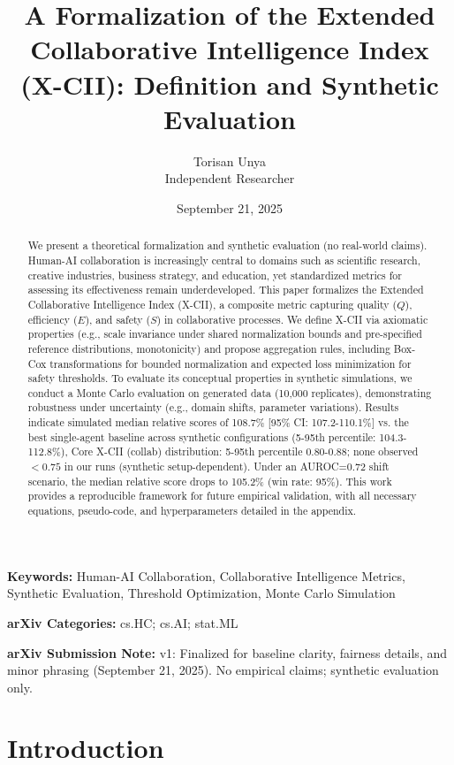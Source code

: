 \documentclass{article}
\title{A Formalization of the Extended Collaborative Intelligence Index (X-CII): Definition and Synthetic Evaluation}
\author{Torisan Unya \\
Independent Researcher}
\date{September 21, 2025}
\newcommand{\keywords}[1]{\par\noindent\textbf{Keywords:} #1}
\newcommand{\categories}[1]{\par\noindent\textbf{arXiv Categories:} #1}
\begin{document}
\maketitle

\begin{abstract}
We present a theoretical formalization and synthetic evaluation (no real-world claims). Human-AI collaboration is increasingly central to domains such as scientific research, creative industries, business strategy, and education, yet standardized metrics for assessing its effectiveness remain underdeveloped. This paper formalizes the Extended Collaborative Intelligence Index (X-CII), a composite metric capturing quality ($Q$), efficiency ($E$), and safety ($S$) in collaborative processes. We define X-CII via axiomatic properties (e.g., scale invariance under shared normalization bounds and pre-specified reference distributions, monotonicity) and propose aggregation rules, including Box-Cox transformations for bounded normalization and expected loss minimization for safety thresholds. To evaluate its conceptual properties in synthetic simulations, we conduct a Monte Carlo evaluation on generated data (10,000 replicates), demonstrating robustness under uncertainty (e.g., domain shifts, parameter variations). Results indicate simulated median relative scores of 108.7\% [95\% CI: 107.2-110.1\%] vs. the best single-agent baseline across synthetic configurations (5-95th percentile: 104.3-112.8\%), Core X-CII (collab) distribution: 5-95th percentile 0.80-0.88; none observed $<0.75$ in our runs (synthetic setup-dependent). Under an AUROC=0.72 shift scenario, the median relative score drops to 105.2\% (win rate: 95\%). This work provides a reproducible framework for future empirical validation, with all necessary equations, pseudo-code, and hyperparameters detailed in the appendix.
\end{abstract}

\keywords{Human-AI Collaboration, Collaborative Intelligence Metrics, Synthetic Evaluation, Threshold Optimization, Monte Carlo Simulation}

\categories{cs.HC; cs.AI; stat.ML}

\textbf{arXiv Submission Note:} v1: Finalized for baseline clarity, fairness details, and minor phrasing (September 21, 2025). No empirical claims; synthetic evaluation only.

\section{Introduction}
\end{document}
